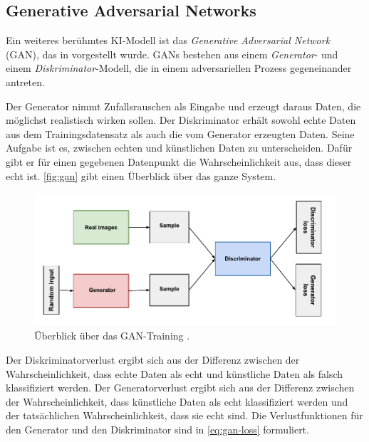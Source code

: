 
\subsection{Generative Adversarial Networks} \label{subsec:gan}

Ein weiteres berühmtes KI-Modell ist das \emph{Generative Adversarial Network} (GAN), das in \parencite{Goodfellow2014gan} vorgestellt wurde. GANs bestehen aus einem \emph{Generator}- und einem \emph{Diskriminator}-Modell, die in einem adversariellen Prozess gegeneinander antreten.

Der Generator nimmt Zufallsrauschen als Eingabe und erzeugt daraus Daten, die möglichst realistisch wirken sollen. Der Diskriminator erhält sowohl echte Daten aus dem Trainingsdatensatz als auch die vom Generator erzeugten Daten. Seine Aufgabe ist es, zwischen echten und künstlichen Daten zu unterscheiden. Dafür gibt er für einen gegebenen Datenpunkt die Wahrscheinlichkeit aus, dass dieser echt ist. \autoref{fig:gan} gibt einen Überblick über das ganze System.

\begin{figure}[h]
	\centering
	\includegraphics[width=\textwidth]{images/figure_gan.pdf}
	\caption[Überblick über das GAN-Training.]{Überblick über das GAN-Training \parencite{GoogleDev2022ganfigure}.}
	\label{fig:gan}
\end{figure}

Der Diskriminatorverlust ergibt sich aus der Differenz zwischen der Wahrscheinlichkeit, dass echte Daten als echt und künstliche Daten als falsch klassifiziert werden. Der Generatorverlust ergibt sich aus der Differenz zwischen der Wahrscheinlichkeit, dass künstliche Daten als echt klassifiziert werden und der tatsächlichen Wahrscheinlichkeit, dass sie echt sind. Die Verlustfunktionen für den Generator und den Diskriminator sind in \autoref{eq:gan-loss} formuliert.

